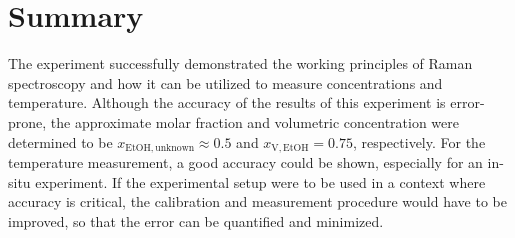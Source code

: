 
\chapter{Summary}
\label{chap:summary}

The experiment successfully demonstrated the working principles of Raman spectroscopy and how it can be utilized to measure concentrations and temperature. Although the accuracy of the results of this experiment is error-prone, the approximate molar fraction and volumetric concentration were determined to be $x_\mathrm{EtOH,unknown} \approx 0.5$ and $x_\mathrm{V,EtOH}=0.75$, respectively. For the temperature measurement, a good accuracy could be shown, especially for an in-situ experiment. If the experimental setup were to be used in a context where accuracy is critical, the calibration and measurement procedure would have to be improved, so that the error can be quantified and minimized.